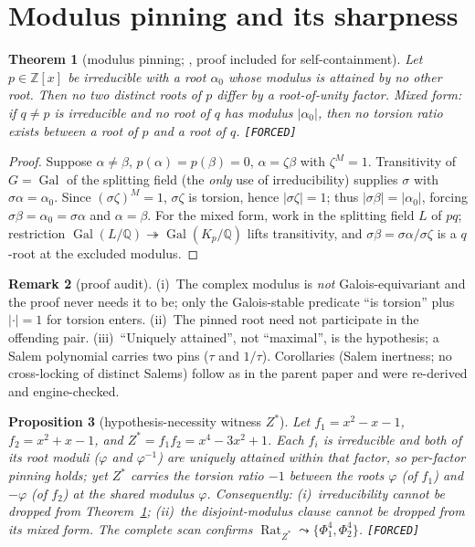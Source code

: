 \documentclass[11pt]{article}
\newcommand{\F}{\textnormal{\texttt{[FORCED]}}}
\newcommand{\Q}{\mathbb{Q}}
\newcommand{\Z}{\mathbb{Z}}
\newcommand{\Rat}{\operatorname{Rat}}
\newcommand{\Gal}{\operatorname{Gal}}
\newtheorem{theorem}{Theorem}[section]
\newtheorem{proposition}[theorem]{Proposition}
\theoremstyle{definition}
\newtheorem{remark}[theorem]{Remark}
\begin{document}
\section{Modulus pinning and its sharpness}\label{sec:pinning}

\begin{theorem}[modulus pinning; {\cite[Thm.~7.13]{relcharge}}, proof included for
self-containment]\label{thm:pin}
Let $p\in\Z[x]$ be irreducible with a root $\alpha_0$ whose modulus is attained
by no other root. Then no two distinct roots of $p$ differ by a root-of-unity
factor. Mixed form: if $q\neq p$ is irreducible and no root of $q$ has modulus
$|\alpha_0|$, then no torsion ratio exists between a root of $p$ and a root of
$q$. \F
\end{theorem}

\begin{proof}
Suppose $\alpha\neq\beta$, $p(\alpha)=p(\beta)=0$, $\alpha=\zeta\beta$ with
$\zeta^M=1$. Transitivity of $G=\Gal$ of the splitting field (the \emph{only}
use of irreducibility) supplies $\sigma$ with $\sigma\alpha=\alpha_0$. Since
$(\sigma\zeta)^M=1$, $\sigma\zeta$ is torsion, hence $|\sigma\zeta|=1$; thus
$|\sigma\beta|=|\alpha_0|$, forcing $\sigma\beta=\alpha_0=\sigma\alpha$ and
$\alpha=\beta$. For the mixed form, work in the splitting field $L$ of $pq$;
restriction $\Gal(L/\Q)\twoheadrightarrow\Gal(K_p/\Q)$ lifts transitivity, and
$\sigma\beta=\sigma\alpha/\sigma\zeta$ is a $q$-root at the excluded modulus.
\end{proof}

\begin{remark}[proof audit]\label{rem:audit}
(i)~The complex modulus is \emph{not} Galois-equivariant and the proof never
needs it to be; only the Galois-stable predicate ``is torsion'' plus $|{\cdot}|=1$
for torsion enters. (ii)~The pinned root need not participate in the offending
pair. (iii)~``Uniquely attained'', not ``maximal'', is the hypothesis; a Salem
polynomial carries two pins ($\tau$ and $1/\tau$). Corollaries
\cite[7.14, 7.15]{relcharge} (Salem inertness; no cross-locking of distinct
Salems) follow as in the parent paper and were re-derived and engine-checked.
\end{remark}

\begin{proposition}[hypothesis-necessity witness $Z^{*}$]\label{prop:zstar}
Let $f_1=x^2-x-1$, $f_2=x^2+x-1$, and
$Z^{*}=f_1f_2=x^4-3x^2+1$. Each $f_i$ is irreducible and \emph{both} of its
root moduli ($\varphi$ and $\varphi^{-1}$) are uniquely attained within that
factor, so per-factor pinning holds; yet $Z^{*}$ carries the torsion ratio $-1$
between the roots $\varphi$ (of $f_1$) and $-\varphi$ (of $f_2$) at the shared
modulus $\varphi$. Consequently: (i)~irreducibility cannot be dropped from
Theorem~\ref{thm:pin}; (ii)~the disjoint-modulus clause cannot be dropped from
its mixed form. The complete scan confirms
$\Rat_{Z^{*}}\leadsto\{\Phi_1^4,\Phi_2^4\}$. \F
\end{proposition}
\end{document}

